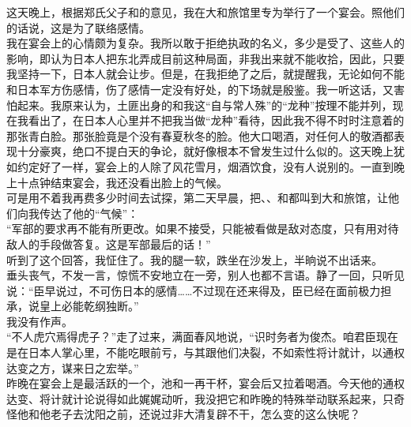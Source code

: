 这天晚上，根据郑氏父子和的意见，我在大和旅馆里专为举行了一个宴会。照他们的话说，这是为了联络感情。\\

我在宴会上的心情颇为复杂。我所以敢于拒绝执政的名义，多少是受了、这些人的影响，即认为日本人把东北弄成目前这种局面，非我出来就不能收拾，因此，只要我坚持一下，日本人就会让步。但是，在我拒绝了之后，就提醒我，无论如何不能和日本军方伤感情，伤了感情一定没有好处，的下场就是殷鉴。我一听这话，又害怕起来。我原来认为，土匪出身的和我这“自与常人殊”的“龙种”按理不能并列，现在我看出了，在日本人心里并不把我当做“龙种”看待，因此我不得不时时注意着的那张青白脸。那张脸竟是个没有春夏秋冬的脸。他大口喝酒，对任何人的敬酒都表现十分豪爽，绝口不提白天的争论，就好像根本不曾发生过什么似的。这天晚上犹如约定好了一样，宴会上的人除了风花雪月，烟酒饮食，没有人说别的。一直到晚上十点钟结束宴会，我还没看出脸上的气候。\\

可是用不着我再费多少时间去试探，第二天早晨，把、、和都叫到大和旅馆，让他们向我传达了他的“气候”：\\

“军部的要求再不能有所更改。如果不接受，只能被看做是敌对态度，只有用对待敌人的手段做答复。这是军部最后的话！”\\

听到了这个回答，我怔住了。我的腿一软，跌坐在沙发上，半晌说不出话来。\\

垂头丧气，不发一言，惊慌不安地立在一旁，别人也都不言语。静了一回，只听见说：“臣早说过，不可伤日本的感情……不过现在还来得及，臣已经在面前极力担承，说皇上必能乾纲独断。”\\

我没有作声。\\

“不人虎穴焉得虎子？”走了过来，满面春风地说，“识时务者为俊杰。咱君臣现在是在日本人掌心里，不能吃眼前亏，与其跟他们决裂，不如索性将计就计，以通权达变之方，谋来日之宏举。”\\

昨晚在宴会上是最活跃的一个，池和一再干杯，宴会后又拉着喝酒。今天他的通权达变、将计就计论说得如此娓娓动听，我没把它和昨晚的特殊举动联系起来，只奇怪他和他老子去沈阳之前，还说过非大清复辟不干，怎么变的这么快呢？\\

